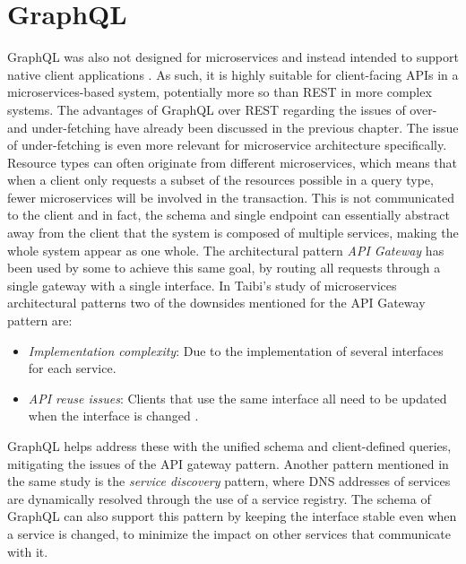 \section{GraphQL}
GraphQL was also not designed for microservices and instead intended to support native client applications \cite{schrock2015blog}. As such, it is highly suitable for client-facing APIs in a microservices-based system, potentially more so than REST in more complex systems. The advantages of GraphQL over REST regarding the issues of over- and under-fetching have already been discussed in the previous chapter. The issue of under-fetching is even more relevant for microservice architecture specifically. Resource types can often originate from different microservices, which means that when a client only requests a subset of the resources possible in a query type, fewer microservices will be involved in the transaction. This is not communicated to the client and in fact, the schema and single endpoint can essentially abstract away from the client that the system is composed of multiple services, making the whole system appear as one whole. The architectural pattern \textit{API Gateway} has been used by some to achieve this same goal, by routing all requests through a single gateway with a single interface. In Taibi's study of microservices architectural patterns two of the downsides mentioned for the API Gateway pattern are:
\begin{itemize}
    \item \textit{Implementation complexity}: Due to the implementation of several interfaces for each service.
    \item \textit{API reuse issues}: Clients that use the same interface all need to be updated when the interface is changed \cite{taibi2018architectural}.
\end{itemize}
GraphQL helps address these with the unified schema and client-defined queries, mitigating the issues of the API gateway pattern. Another pattern mentioned in the same study is the \textit{service discovery} pattern, where DNS addresses of services are dynamically resolved through the use of a service registry. The schema of GraphQL can also support this pattern by keeping the interface stable even when a service is changed, to minimize the impact on other services that communicate with it.

